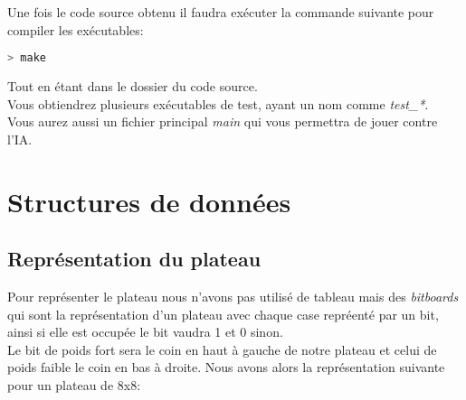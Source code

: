 \documentclass{article}
\begin{document}
Une fois le code source obtenu il faudra exécuter la commande suivante pour compiler les exécutables:
\begin{lstlisting}[language=bash]
	> make
\end{lstlisting}

Tout en étant dans le dossier du code source.\\

Vous obtiendrez plusieurs exécutables de test, ayant un nom comme \textit{test\_*}.\\
Vous aurez aussi un fichier principal \textit{main} qui vous permettra de jouer contre l'IA.

\pagebreak
\section{Structures de données}
\subsection{Représentation du plateau}

Pour représenter le plateau nous n'avons pas utilisé de tableau mais des \textit{bitboards} qui
sont la représentation d'un plateau avec chaque case repréenté par un bit, ainsi si elle est
occupée le bit vaudra 1 et 0 sinon.\\
Le bit de poids fort sera le coin en haut à gauche de notre plateau et celui de poids faible le coin 
en bas à droite. Nous avons alors la représentation suivante pour un plateau de 8x8:
\end{document}

